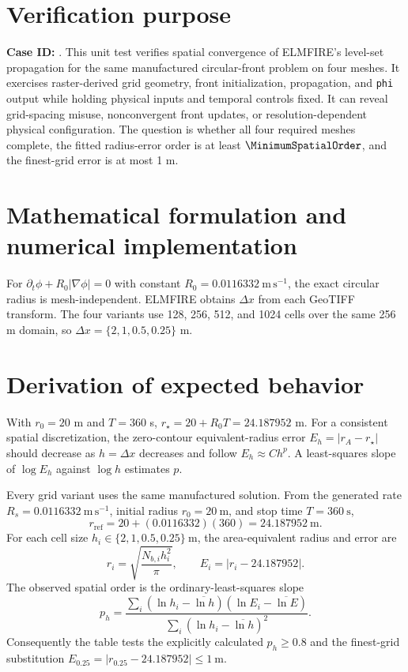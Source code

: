\section{Verification purpose}

\textbf{Case ID:} \texttt{\CaseID}. This unit test verifies spatial convergence of ELMFIRE's level-set propagation for the same manufactured circular-front problem on four meshes. It exercises raster-derived grid geometry, front initialization, propagation, and \texttt{phi} output while holding physical inputs and temporal controls fixed. It can reveal grid-spacing misuse, nonconvergent front updates, or resolution-dependent physical configuration. The question is whether all four required meshes complete, the fitted radius-error order is at least \(\MinimumSpatialOrder\), and the finest-grid error is at most 1 m.

\section{Mathematical formulation and numerical implementation}

For \(\partial_t\phi+R_0|\nabla\phi|=0\) with constant \(R_0=0.0116332~\mathrm{m\,s^{-1}}\), the exact circular radius is mesh-independent. ELMFIRE obtains \(\Delta x\) from each GeoTIFF transform. The four variants use 128, 256, 512, and 1024 cells over the same 256 m domain, so \(\Delta x=\{2,1,0.5,0.25\}\) m.

\section{Derivation of expected behavior}

With \(r_0=20\) m and \(T=360\) s, \(r_\star=20+R_0T=24.187952\) m. For a consistent spatial discretization, the zero-contour equivalent-radius error \(E_h=|r_A-r_\star|\) should decrease as \(h=\Delta x\) decreases and follow \(E_h\approx Ch^p\). A least-squares slope of \(\log E_h\) against \(\log h\) estimates \(p\).

Every grid variant uses the same manufactured solution.  From the generated
rate \(R_s=0.0116332~\mathrm{m\,s^{-1}}\), initial radius
\(r_0=20~\mathrm{m}\), and stop time \(T=360~\mathrm{s}\),
\[
 r_{\mathrm{ref}}=20+(0.0116332)(360)=24.187952~\mathrm{m}.
\]
For each cell size \(h_i\in\{2,1,0.5,0.25\}~\mathrm{m}\), the area-equivalent
radius and error are
\[
 r_i=\sqrt{\frac{N_{b,i}h_i^2}{\pi}},\qquad E_i=|r_i-24.187952|.
\]
The observed spatial order is the ordinary-least-squares slope
\[
 p_h=\frac{\sum_i(\ln h_i-\overline{\ln h})(\ln E_i-\overline{\ln E})}
 {\sum_i(\ln h_i-\overline{\ln h})^2}.
\]
Consequently the table tests the explicitly calculated \(p_h\geq0.8\) and
the finest-grid substitution \(E_{0.25}=|r_{0.25}-24.187952|\leq1~\mathrm{m}\).

